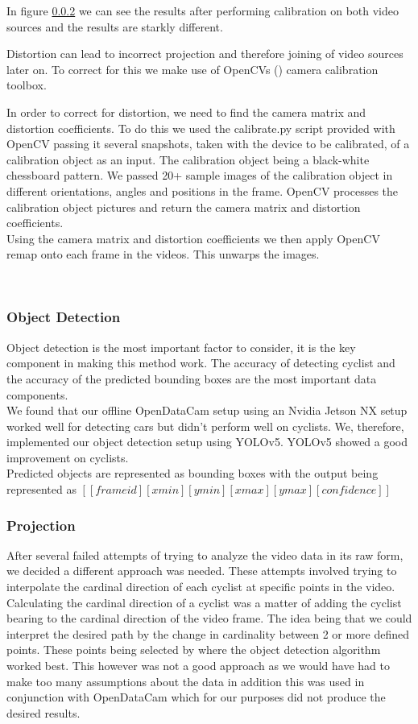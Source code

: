 In figure \ref{} we can see the results after performing calibration on both video sources and the results are starkly different.

Distortion can lead to incorrect projection and therefore joining of video sources later on.
To correct for this we make use of OpenCVs (\cite{noauthor_opencv/opencv_2021}) camera calibration toolbox.

In order to correct for distortion, we need to find the camera matrix and distortion coefficients. To do this we used the calibrate.py script provided with OpenCV
passing it several snapshots, taken with the device to be calibrated, of a calibration object as an input. The calibration object being a black-white chessboard pattern.
We passed 20+ sample images of the calibration object in different orientations, angles and positions in the frame. OpenCV processes the calibration object pictures and
return the camera matrix and distortion coefficients.
\ \\
Using the camera matrix and distortion coefficients we then apply OpenCV remap onto each frame in the videos. This unwarps the images.

\ \\
\subsubsection{Object Detection}

Object detection is the most important factor to consider, it is the key component in making this method work. The accuracy of detecting cyclist and the accuracy of the
predicted bounding boxes are the most important data components.
\ \\

We found that our offline OpenDataCam setup using an Nvidia Jetson NX setup worked well for detecting cars but didn't perform well on cyclists. 
We, therefore, implemented our object detection setup using
YOLOv5. YOLOv5 showed a good improvement on cyclists.
\ \\ 
Predicted objects are represented as bounding boxes with the output being represented as $[[frame id][xmin][ymin][xmax][ymax][confidence]]$

\color{red}
\subsubsection{Projection}
After several failed attempts of trying to analyze the video data in its raw form, we decided a different approach was needed.
These attempts involved trying to interpolate the cardinal direction of each cyclist at specific points in the video. Calculating the cardinal direction
of a cyclist was a matter of adding the cyclist bearing to the cardinal direction of the video frame. The idea being that we could interpret
the desired path by the change in cardinality between 2 or more defined points. These points being selected by where the object detection algorithm worked best.
This however was not a good approach as we would have had to make too many assumptions about the data in addition this was used in conjunction
with OpenDataCam which for our purposes did not produce the desired results.
\color{black}
\ \\

